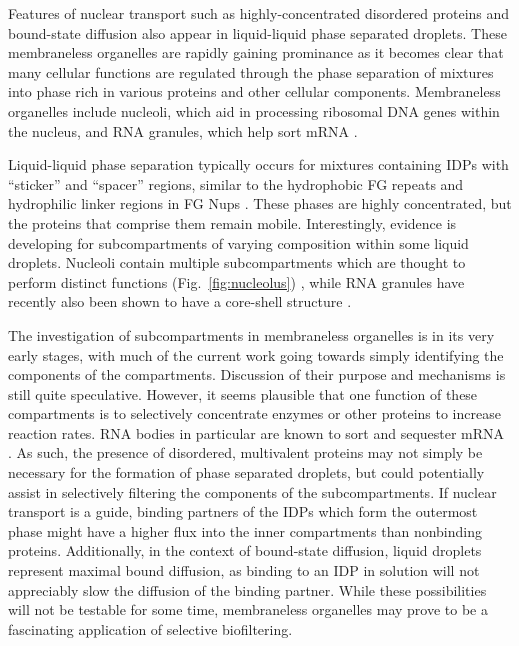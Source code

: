 Features of nuclear transport such as highly-concentrated disordered proteins and bound-state diffusion also appear in liquid-liquid phase separated droplets.  These membraneless organelles are rapidly gaining prominance as it becomes clear that many cellular functions are regulated through the phase separation of mixtures into phase rich in various proteins and other cellular components.  Membraneless organelles include nucleoli, which aid in processing ribosomal DNA genes within the nucleus, and RNA granules, which help sort mRNA \cite{shiina19, brangwynne15}.

Liquid-liquid phase separation typically occurs for mixtures containing IDPs with ``sticker'' and ``spacer'' regions, similar to the hydrophobic FG repeats and hydrophilic linker regions in FG Nups \cite{posey18}.  These phases are highly concentrated, but the proteins that comprise them remain mobile.  Interestingly, evidence is developing for subcompartments of varying composition within some liquid droplets.  Nucleoli contain multiple subcompartments which are thought to perform distinct functions (Fig.~\ref{fig:nucleolus}) \cite{feric16,catalano15,oday19}, while RNA granules have recently also been shown to have a core-shell structure \cite{jain16,shiina19}.

The investigation of subcompartments in membraneless organelles is in its very early stages, with much of the current work going towards simply identifying the components of the compartments.  Discussion of their purpose and mechanisms is still quite speculative.  However, it seems plausible that one function of these compartments is to selectively concentrate enzymes or other proteins to increase reaction rates.  RNA bodies in particular are known to sort and sequester mRNA \cite{shiina19}.  As such, the presence of disordered, multivalent proteins may not simply be necessary for the formation of phase separated droplets, but could potentially assist in selectively filtering the components of the subcompartments.  If nuclear transport is a guide, binding partners of the IDPs which form the outermost phase might have a higher flux into the inner compartments than nonbinding proteins.  Additionally, in the context of bound-state diffusion, liquid droplets represent maximal bound diffusion, as binding to an IDP in solution will not appreciably slow the diffusion of the binding partner.  While these possibilities will not be testable for some time, membraneless organelles may prove to be a fascinating application of selective biofiltering.

